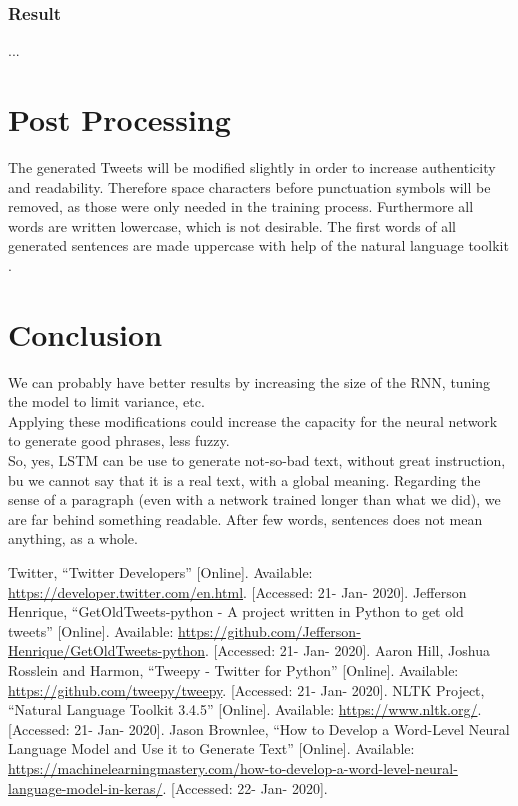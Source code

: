 \documentclass[conference]{IEEEtran}
\begin{document}
\subsubsection{Result}

...

\section{Post Processing}

The generated Tweets will be modified slightly in order to increase authenticity and readability. Therefore space characters before punctuation symbols will be removed, as those were only needed in the training process. Furthermore all words are written lowercase, which is not desirable. The first words of all generated sentences are made uppercase with help of the natural language toolkit \cite{nltk}.

\section{Conclusion}

We can probably have better results by increasing the size of the RNN, tuning the model to limit variance, etc.\\
Applying these modifications could increase the capacity for the neural network to generate good phrases, less fuzzy.\\
So, yes, LSTM can be use to generate not-so-bad text, without great instruction, bu we cannot say that it is a real text, with a global meaning. Regarding the sense of a paragraph (even with a network trained longer than what we did), we are far behind something readable. After few words, sentences does not mean anything, as a whole.

\begin{thebibliography}{00}
 Twitter, ``Twitter Developers'' [Online]. Available: \url{https://developer.twitter.com/en.html}. [Accessed: 21- Jan- 2020].
 Jefferson Henrique, ``GetOldTweets-python - A project written in Python to get old tweets'' [Online]. Available: \url{https://github.com/Jefferson-Henrique/GetOldTweets-python}. [Accessed: 21- Jan- 2020].
 Aaron Hill, Joshua Rosslein and Harmon, ``Tweepy - Twitter for Python'' [Online]. Available: \url{https://github.com/tweepy/tweepy}. [Accessed: 21- Jan- 2020].
 NLTK Project, ``Natural Language Toolkit 3.4.5'' [Online]. Available: \url{https://www.nltk.org/}. [Accessed: 21- Jan- 2020].
 Jason Brownlee, ``How to Develop a Word-Level Neural Language Model and Use it to Generate Text'' [Online]. Available: \url{https://machinelearningmastery.com/how-to-develop-a-word-level-neural-language-model-in-keras/}. [Accessed: 22- Jan- 2020].
\end{thebibliography}
\end{document}
